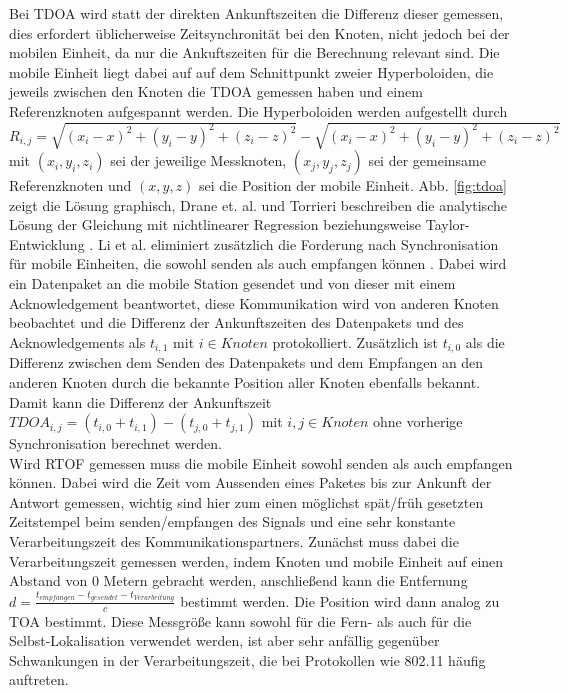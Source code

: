 Bei TDOA wird statt der direkten Ankunftszeiten die Differenz dieser gemessen, dies erfordert üblicherweise Zeitsynchronität bei den Knoten, nicht jedoch bei der mobilen Einheit, da nur die Ankuftszeiten für die Berechnung relevant sind. Die mobile Einheit liegt dabei auf auf dem Schnittpunkt zweier Hyperboloiden, die jeweils zwischen den Knoten die TDOA gemessen haben und einem Referenzknoten aufgespannt werden. 
Die Hyperboloiden werden aufgestellt durch \\
$R_{i,j} = \sqrt{(x_i - x)^2 + (y_i - y)^2 + (z_i - z)^2} - \sqrt{(x_i - x)^2 + (y_i - y)^2 + (z_i - z)^2}$ mit $(x_i,y_i,z_i)$ sei der jeweilige Messknoten, $(x_j,y_j,z_j)$ sei der gemeinsame Referenzknoten und $(x,y,z)$ sei die Position der mobile Einheit. Abb. \ref{fig:tdoa} zeigt die Lösung graphisch, Drane et. al. und Torrieri beschreiben die analytische Lösung der Gleichung mit nichtlinearer Regression \cite{drane1998positioning} beziehungsweise Taylor-Entwicklung \cite{torrieri1984statistical}. 
Li et al. eliminiert zusätzlich die Forderung nach Synchronisation für mobile Einheiten, die sowohl senden als auch empfangen können \cite{li2000comparison}. 
Dabei wird ein Datenpaket an die mobile Station gesendet und von dieser mit einem Acknowledgement beantwortet, diese Kommunikation wird von anderen Knoten beobachtet und die Differenz der Ankunftszeiten des Datenpakets und des Acknowledgements als $t_{i,1}$ mit $i \in Knoten$ protokolliert. Zusätzlich ist $t_{i,0}$ als die Differenz zwischen dem Senden des Datenpakets und dem Empfangen an den anderen Knoten durch die bekannte Position aller Knoten ebenfalls bekannt. Damit kann die Differenz der Ankunftszeit $TDOA_{i,j} = (t_{i,0} + t_{i,1}) - (t_{j,0} + t_{j,1})$ mit $i,j \in Knoten$ ohne vorherige Synchronisation berechnet werden. \\
Wird RTOF gemessen muss die mobile Einheit sowohl senden als auch empfangen können. Dabei wird die Zeit vom Aussenden eines Paketes bis zur Ankunft der Antwort gemessen, wichtig sind hier zum einen möglichst spät/früh gesetzten Zeitstempel beim senden/empfangen des Signals und eine sehr konstante Verarbeitungszeit des Kommunikationspartners. Zunächst muss dabei die Verarbeitungszeit gemessen werden, indem Knoten und mobile Einheit auf einen Abstand von 0 Metern gebracht werden, anschließend kann die Entfernung $d = \frac{t_{empfangen} - t_{gesendet} - t_{Verarbeitung}}{c}$ bestimmt werden. Die Position wird dann analog zu TOA bestimmt. Diese Messgröße kann sowohl für die Fern- als auch für die Selbst-Lokalisation verwendet werden, ist aber sehr anfällig gegenüber Schwankungen in der Verarbeitungszeit, die bei Protokollen wie 802.11 häufig auftreten. \\
